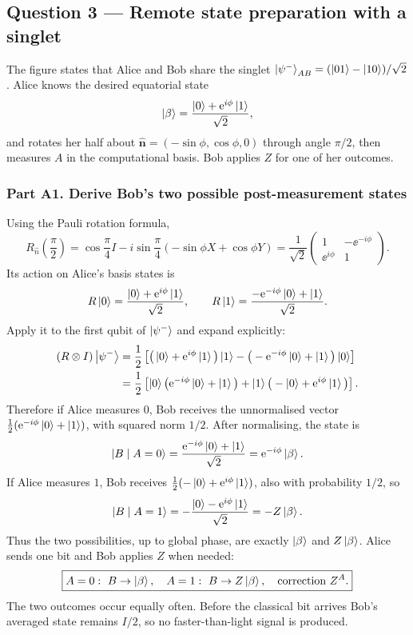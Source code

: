 \subsection{Question 3 --- Remote state preparation with a singlet}
The figure states that Alice and Bob share the singlet $\left\lvert \psi^-\right\rangle_{AB}=(\left\lvert 01\right\rangle-\left\lvert 10\right\rangle)/\sqrt2$. Alice knows the desired equatorial state
\begin{equation}\left\lvert \beta\right\rangle=\frac{\left\lvert 0\right\rangle+\mathrm{e}^{i\phi}\left\lvert 1\right\rangle}{\sqrt2},\end{equation}
and rotates her half about $\hat{\bm n}=(-\sin\phi,\cos\phi,0)$ through angle $\pi/2$, then measures $A$ in the computational basis. Bob applies $Z$ for one of her outcomes.

\subsubsection*{Part A1. Derive Bob's two possible post-measurement states}
Using the Pauli rotation formula,
\begin{equation}R_{\hat n}\!\left(\frac\pi2\right)=\cos\frac\pi4 I-i\sin\frac\pi4(-\sin\phi X+\cos\phi Y)
=\frac1{\sqrt2}\begin{pmatrix}1&-\ee^{-i\phi}\\\ee^{i\phi}&1\end{pmatrix}.\end{equation}
Its action on Alice's basis states is
\begin{equation}R\left\lvert 0\right\rangle=\frac{\left\lvert 0\right\rangle+\mathrm{e}^{i\phi}\left\lvert 1\right\rangle}{\sqrt2},\qquad
R\left\lvert 1\right\rangle=\frac{-\mathrm{e}^{-i\phi}\left\lvert 0\right\rangle+\left\lvert 1\right\rangle}{\sqrt2}.\end{equation}
Apply it to the first qubit of $\left\lvert \psi^-\right\rangle$ and expand explicitly:
\begin{align}
(R\otimes I)\left\lvert \psi^-\right\rangle
&=\frac12\left[\big(\left\lvert 0\right\rangle+\mathrm{e}^{i\phi}\left\lvert 1\right\rangle\big)\left\lvert 1\right\rangle-\big(-\mathrm{e}^{-i\phi}\left\lvert 0\right\rangle+\left\lvert 1\right\rangle\big)\left\lvert 0\right\rangle\right]\\
&=\frac12\left[\left\lvert 0\right\rangle\big(\mathrm{e}^{-i\phi}\left\lvert 0\right\rangle+\left\lvert 1\right\rangle\big)+\left\lvert 1\right\rangle\big(-\left\lvert 0\right\rangle+\mathrm{e}^{i\phi}\left\lvert 1\right\rangle\big)\right].
\end{align}
Therefore if Alice measures $0$, Bob receives the unnormalised vector $\tfrac12(\mathrm{e}^{-i\phi}\left\lvert 0\right\rangle+\left\lvert 1\right\rangle)$, with squared norm $1/2$. After normalising, the state is
\begin{equation}\left\lvert B\mid A=0\right\rangle=\frac{\mathrm{e}^{-i\phi}\left\lvert 0\right\rangle+\left\lvert 1\right\rangle}{\sqrt2}=\mathrm{e}^{-i\phi}\left\lvert \beta\right\rangle.\end{equation}
If Alice measures $1$, Bob receives $\tfrac12(-\left\lvert 0\right\rangle+\mathrm{e}^{i\phi}\left\lvert 1\right\rangle)$, also with probability $1/2$, so
\begin{equation}\left\lvert B\mid A=1\right\rangle=-\frac{\left\lvert 0\right\rangle-\mathrm{e}^{i\phi}\left\lvert 1\right\rangle}{\sqrt2}=-Z\left\lvert \beta\right\rangle.\end{equation}
Thus the two possibilities, up to global phase, are exactly $\left\lvert \beta\right\rangle$ and $Z\left\lvert \beta\right\rangle$. Alice sends one bit and Bob applies $Z$ when needed:
\begin{equation}\boxed{A=0:\ B\to\ket\beta,\quad A=1:\ B\to Z\ket\beta,\quad \text{correction }Z^{A}.}\end{equation}
The two outcomes occur equally often. Before the classical bit arrives Bob's averaged state remains $I/2$, so no faster-than-light signal is produced.

